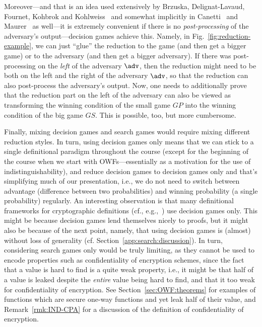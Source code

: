 Moreover---and that is an idea used extensively by Brzuska, Delignat-Lavaud, Fournet, Kohbrok and Kohlweiss~\cite{BDFKK18} and somewhat implicitly in Canetti~\cite{Canetti20} and Maurer~\cite{Maurer10} as well---it is extremely convenient if there is no \emph{post-processing} of the adversary's output---decision games achieve this. Namely, in Fig.~\ref{fig:reduction-example}, we can just ``glue'' the reduction to the game (and then get a bigger game) or to the adversary (and then get a bigger adversary). If there was post-processing on the \emph{left} of the adversary $\adv$, then the reduction might need to be both on the left and the right of the adversary $\adv$, so that the reduction can also post-process the adversary's output. Now, one needs to additionally prove that the reduction part on the left of the adversary can also be viewed as transforming the winning condition of the small game $GP$ into the winning condition of the big game $GS$. This is possible, too, but more cumbersome.

Finally, mixing decision games and search games would require mixing different reduction styles. In turn, using decision games only means that we can stick to a single definitional paradigm throughout the course (except for the beginning of the course when we start with OWFs---essentially as a motivation for the use of indistinguishability), and reduce decision games to decision games only and that's simplifying much of our presentation, i.e., we do not need to switch between advantage (difference between two probabilities) and winning probability (a single probability) regularly. An interesting observation is that many definitional frameworks for cryptographic definitions (cf., e.g.,~\cite{Canetti20,Maurer10,BDFKK18}) use decision games only. This might be because decision games lend themselves nicely to proofs, but it might also be because of the next point, namely, that using decision games is (almost) without loss of generality (cf. Section~\ref{app:search:discussion}).
In turn, considering search games only would be truly limiting, as they cannot be used to encode properties such as confidentiality of encryption schemes, since the fact that a value is hard to find is a quite weak property, i.e., it might be that half of a value is leaked despite the \emph{entire} value being hard to find, and that it too weak for confidentiality of encryption. See Section~\ref{sec:OWF:theorems} for examples of functions which are secure one-way functions and yet leak half of their value, and Remark~\ref{rmk:IND-CPA} for a discussion of the definition of confidentiality of encryption.


